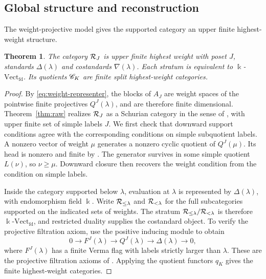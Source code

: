 \documentclass[11pt,reqno]{amsart}
\newcommand{\kk}{\Bbbk}\newcommand{\ZZ}{\mathbb Z}\newcommand{\NN}{\mathbb N}
\newtheorem{theorem}{Theorem}[section]
\theoremstyle{definition}
\theoremstyle{remark}
\numberwithin{equation}{section}
\begin{document}
\subsection{Global structure and reconstruction}
The weight-projective model gives the supported category an upper
finite highest-weight structure.

\begin{theorem}\label{thm:global-category}
The category $\mathcal R_J$ is upper finite highest weight with poset $J$,
standards $\Delta(\lambda)$ and costandards $\nabla(\lambda)$.
Each stratum is equivalent to $\kk$-\(\mathrm{Vect}_{\mathrm{fd}}\).
Its quotients $\mathscr C_K$ are finite split highest-weight
categories.
\end{theorem}

\begin{proof}
By \eqref{eq:weight-representer}, the blocks of $A_J$ are weight
spaces of the pointwise finite projectives $Q^J(\lambda)$, and are
therefore finite dimensional. Theorem~\ref{thm:raw} realizes
$\mathcal R_J$ as a Schurian category in the sense of
\cite[Section~2.3]{BS}, with upper finite set of simple labels $J$.
We first check that downward support conditions agree with the
corresponding conditions on simple subquotient labels. A nonzero
vector of weight $\mu$ generates a nonzero cyclic quotient of
$Q^J(\mu)$. Its head is nonzero and finite by \cite[Lemma~2.14]{BS}.
The generator survives in some simple quotient $L(\nu)$, so
$\nu\geq\mu$. Downward closure then recovers the weight condition
from the condition on simple labels.

Inside the category supported below $\lambda$, evaluation at
$\lambda$ is represented by $\Delta(\lambda)$, with endomorphism
field $\kk$. Write $\mathcal R_{\leq\lambda}$ and $\mathcal R_{<\lambda}$ for
the full subcategories supported on the indicated sets of weights.
The stratum $\mathcal R_{\leq\lambda}/\mathcal R_{<\lambda}$ is therefore
$\kk$-\(\mathrm{Vect}_{\mathrm{fd}}\), and restricted duality
supplies the costandard object. To verify the projective filtration
axiom, use the positive inducing module to obtain
\begin{equation}\label{eq:standard-projective-sequence}
 0\longrightarrow F^J(\lambda)\longrightarrow Q^J(\lambda)
 \longrightarrow\Delta(\lambda)\longrightarrow0,
\end{equation}
where $F^J(\lambda)$ has a finite Verma flag with labels strictly
larger than $\lambda$. These are the projective filtration axioms
of \cite[Theorem~3.33 and Definition~3.34]{BS}. Applying the quotient
functors $q_K$ gives the finite highest-weight categories.
\end{proof}
\end{document}
